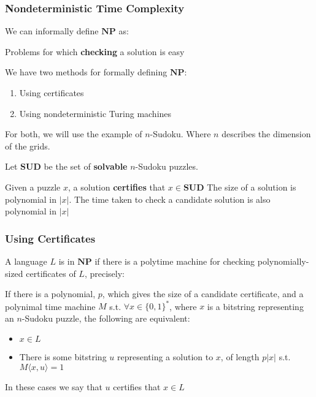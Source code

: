 \documentclass{beamer}
\begin{document}
  \begin{frame}
    \frametitle{Nondeterministic Time Complexity}
    We can informally define $\mathbf{NP} $ as:

    \begin{definition}[NP - informal]
     Problems for which \textbf{checking} a solution is easy
   \end{definition}

   We have two methods for formally defining $\mathbf{NP} $:

   \begin{enumerate}
     \item Using certificates

     \item Using nondeterministic Turing machines
   \end{enumerate}

   For both, we will use the example of $n$-Sudoku. Where $n$ describes the dimension of the grids.

   Let $\mathbf{SUD} $ be the set of \textbf{solvable} $n$-Sudoku puzzles.

   Given a puzzle $x$, a solution \textbf{certifies} that $x \in \mathbf{SUD}$ The size of a solution is polynomial in $|x|$. The time taken to check a candidate solution is also polynomial in $|x|$

 \end{frame}

 \begin{frame}
   \frametitle{Using Certificates}
   \begin{definition}[NP - certificates]
     A language $L$ is in $\mathbf{NP} $ if there is a polytime machine for checking polynomially-sized certificates of $L$, precisely:

     If there is a polynomial, $p$, which gives the size of a candidate certificate, and a polynimal time machine $M$ s.t. $\forall x \in \{ 0,1 \} ^{*}$, where $x$ is a bitstring representing an $n$-Sudoku puzzle, the following are equivalent:

     \begin{itemize}
       \item $x \in L$

       \item There is some bitstring $u$ representing a solution to $x$, of length $p|x|$ s.t. $M \langle x,u \rangle =1$
     \end{itemize}

     In these cases we say that $u$ certifies that $x \in L$
   \end{definition}
 \end{frame}
\end{document}
